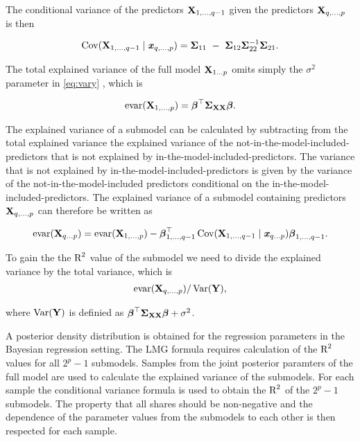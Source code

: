 \documentclass[11pt,a4paper,twoside]{book}
\begin{document}
 The conditional variance of the predictors $ {\mathbf{X}}_{1 ,\dotsc, q-1} $ given the predictors  $ {\mathbf{X}}_{q ,\dotsc, p} $ is then
 
          \begin{align*} 
 \cov(\X_{1,\dotsc, q-1} \mid \x_{q ,\dotsc, p}) = \bSigma_{11}\ -\ \bSigma_{12} \bSigma_{22}^{-1}\bSigma_{21} .
       \end{align*}
       
       The total explained variance of the full model ${\mathbf{X}}_{1 \dots p}$ omits simply the $\sigma^2$ parameter in \eqref{eq:vary} , which is

      \begin{align*} 
        \text{evar}({\mathbf{X}}_{1 ,\dotsc, p}) = {\boldsymbol{\beta}}^\top {\boldsymbol{\Sigma}}{}_{{\mathbf{X}} {\mathbf{X}}}  {\boldsymbol{\beta}}. 
   \end{align*}

The explained variance of a submodel can be calculated by subtracting from the total explained variance the explained variance of the not-in-the-model-included-predictors that is not explained by in-the-model-included-predictors. The variance that is not explained by in-the-model-included-predictors is given by the variance of the not-in-the-model-included predictors conditional on the in-the-model-included-predictors. The explained variance of a submodel containing predictors ${\mathbf{X}}_{q ,\dotsc, p}$ can therefore be written as

       \begin{align} 
       \text{evar}({\mathbf{X}}_{q \dots p}) =  \text{evar}({\mathbf{X}}_{1  ,\dotsc, p}) - {\boldsymbol{\beta}}^\top_{1 ,\dotsc, q-1} \operatorname{Cov}({\mathbf{X}}_{1,\dotsc, {q-1}} \mid {\textbf{\textit{x}}}_{q \dots p}) {\boldsymbol{\beta}}_{1 ,\dotsc, {q-1}} . \label{eq:varsub} 
   \end{align}

To gain the the $\text{R}^2$ value of the submodel we need to divide the explained variance by the total variance, which is
       \begin{align*} 
\text{evar}({\mathbf{X}}_{q ,\dotsc, p}) / \operatorname{Var}({\mathbf{Y}}),   
\end{align*}

where $\operatorname{Var}({\mathbf{Y}})$ is definied as  ${\boldsymbol{\beta}}^\top {\boldsymbol{\Sigma}}{}_{{\mathbf{X}} {\mathbf{X}}}  {\boldsymbol{\beta}} + \sigma^2$.



A posterior density distribution is obtained for the regression parameters in the Bayesian regression setting. The LMG formula requires calculation of the $\text{R}^2$ values for all $2^p-1$ submodels. Samples from the joint posterior paramters of the full model are used to calculate the explained variance of the  submodels. For each sample the  conditional variance formula is used to obtain the $\text{R}^2$ of the $2^p-1$ submodels. The property that all shares should be non-negative and the dependence of the parameter values from the submodels to each other is then respected for each sample. 
\end{document}
